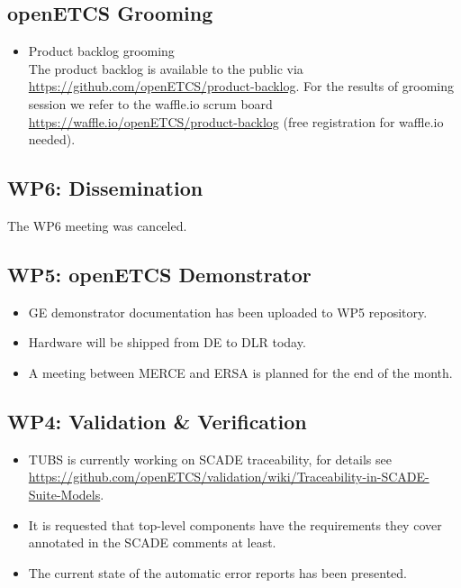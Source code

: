 \documentclass[a4paper, 11pt]{article}
\begin{document}
\subsection{openETCS Grooming}
\begin{itemize}
\item Product backlog grooming\\
The product backlog is available to the public via 
\url{https://github.com/openETCS/product-backlog}. For the results of grooming session we refer to the waffle.io scrum board \url{https://waffle.io/openETCS/product-backlog} (free registration for waffle.io needed).

\end{itemize}

\subsection{WP6: Dissemination}

The WP6 meeting was canceled.
 
\subsection{WP5: openETCS Demonstrator}

\begin{itemize}
\item GE demonstrator documentation has been uploaded to WP5 repository.
\item Hardware will be shipped from DE to DLR today.
\item A meeting between MERCE and ERSA is planned for the end of the month.
\end{itemize}

\subsection{WP4: Validation \& Verification}
\begin{itemize}
\item TUBS is currently working on SCADE traceability, for details see \url{https://github.com/openETCS/validation/wiki/Traceability-in-SCADE-Suite-Models}.\
\item It is requested that top-level components have the requirements they cover annotated in the SCADE comments at least.
\item The current state of the automatic error reports has been presented.
\end{itemize}
\end{document}
